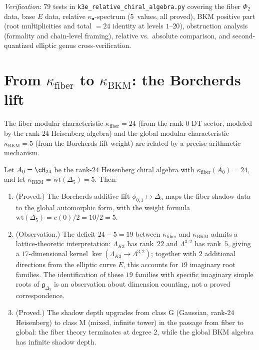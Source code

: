 \noindent\textit{Verification}: 79 tests in
\texttt{k3e\_relative\_chiral\_algebra.py} covering the fiber
$\Phi_2$ data, base $E$ data, relative $\kappa_\bullet$-spectrum (5~values,
all proved), BKM positive part (root multiplicities and total
$= 24$ identity at levels $1$--$20$), obstruction analysis
(formality and chain-level framing), relative vs.\ absolute
comparison, and second-quantized elliptic genus cross-verification.


\section{From $\kappa_{\mathrm{fiber}}$ to $\kappa_{\mathrm{BKM}}$: the Borcherds lift}
\label{sec:k3e-fiber-to-global}

The fiber modular characteristic $\kappa_{\mathrm{fiber}} = 24$ (from the rank-$0$ DT sector, modeled by the rank-$24$ Heisenberg algebra) and the global modular characteristic $\kappa_{\mathrm{BKM}} = 5$ (from the Borcherds lift weight) are related by a precise arithmetic mechanism.

\begin{proposition}
\label{prop:k3e-fiber-global}
Let $A_0 = \cH_{24}$ be the rank-$24$ Heisenberg chiral algebra with $\kappa_{\mathrm{fiber}}(A_0) = 24$, and let $\kappa_{\mathrm{BKM}} = \mathrm{wt}(\Delta_5) = 5$. Then:
\begin{enumerate}[label=(\roman*)]
 \item \textup{(Proved.)} The Borcherds additive lift $\phi_{0,1} \mapsto \Delta_5$ maps the fiber shadow data to the global automorphic form, with the weight formula $\mathrm{wt}(\Delta_5) = c(0)/2 = 10/2 = 5$.
 \item \textup{(Observation.)} The deficit $24 - 5 = 19$ between $\kappa_{\mathrm{fiber}}$ and $\kappa_{\mathrm{BKM}}$ admits a lattice-theoretic interpretation: $\Lambda_{K3}$ has rank~$22$ and $\Lambda^{3,2}$ has rank~$5$, giving a $17$-dimensional kernel $\ker(\Lambda_{K3} \to \Lambda^{3,2})$; together with $2$ additional directions from the elliptic curve $E$, this accounts for $19$ imaginary root families. The identification of these $19$ families with specific imaginary simple roots of $\mathfrak{g}_{\Delta_5}$ is an observation about dimension counting, not a proved correspondence.
 \item \textup{(Proved.)} The shadow depth upgrades from class G (Gaussian, rank-$24$ Heisenberg) to class M (mixed, infinite tower) in the passage from fiber to global: the fiber theory terminates at degree $2$, while the global BKM algebra has infinite shadow depth.
\end{enumerate}
\ClaimStatusProvedHere
\end{proposition}


